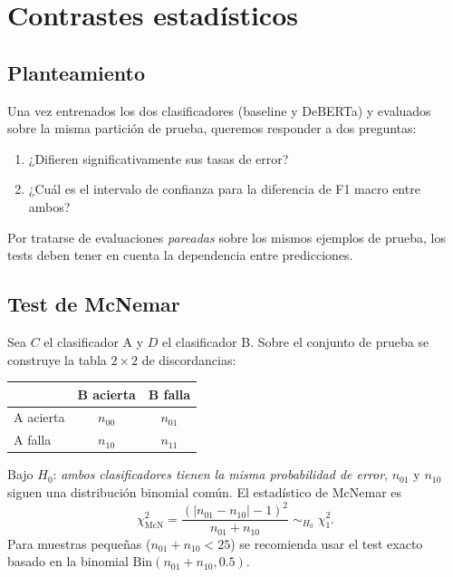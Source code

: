 \chapter{Contrastes estadísticos}\label{cap:tests}

\section{Planteamiento}

Una vez entrenados los dos clasificadores (baseline y DeBERTa) y
evaluados sobre la misma partición de prueba, queremos responder a dos
preguntas:

\begin{enumerate}[leftmargin=*,itemsep=0.2em]
  \item ¿Difieren significativamente sus tasas de error?
  \item ¿Cuál es el intervalo de confianza para la diferencia de F1
        macro entre ambos?
\end{enumerate}

Por tratarse de evaluaciones \emph{pareadas} sobre los mismos ejemplos
de prueba, los tests deben tener en cuenta la dependencia entre
predicciones.

\section{Test de McNemar}

Sea $C$ el clasificador A y $D$ el clasificador B. Sobre el conjunto de
prueba se construye la tabla $2 \times 2$ de discordancias:

\begin{table}[h]
  \centering
  \begin{tabular}{lcc}
    \toprule
                       & B acierta & B falla \\
    \midrule
    A acierta          & $n_{00}$  & $n_{01}$ \\
    A falla            & $n_{10}$  & $n_{11}$ \\
    \bottomrule
  \end{tabular}
\end{table}

Bajo $H_0$: \emph{ambos clasificadores tienen la misma probabilidad de
error}, $n_{01}$ y $n_{10}$ siguen una distribución binomial común. El
estadístico de McNemar \citep{mcnemar1947note} es
\[
  \chi^2_{\text{McN}} = \frac{(|n_{01} - n_{10}| - 1)^2}{n_{01} + n_{10}}
  \;\sim_{H_0}\; \chi^2_1.
\]
Para muestras pequeñas ($n_{01} + n_{10} < 25$) se recomienda usar el
test exacto basado en la binomial $\mathrm{Bin}(n_{01} + n_{10}, 0.5)$.


